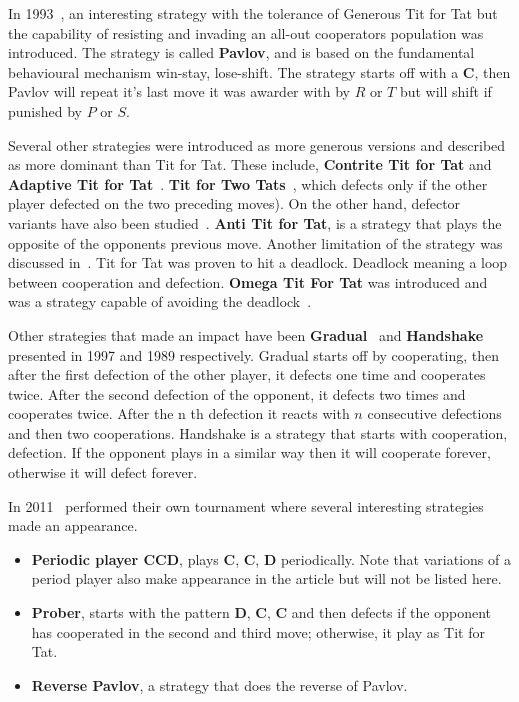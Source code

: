 \documentclass{article}
\begin{document}
In 1993~\cite{Nowak1993}, an interesting strategy with the 
tolerance of Generous Tit for Tat but the capability of resisting and invading
an all-out cooperators population was introduced. The strategy is called \textbf{Pavlov},
and is based on the fundamental behavioural mechanism win-stay, lose-shift.
The strategy starts off with a \textbf{C}, then Pavlov will repeat it's last
move it was awarder with by \(R\) or \(T\) but will shift if punished by \(P\) or
\(S\).

Several other strategies were introduced as more generous versions and 
described as more dominant than Tit for Tat. These include, \textbf{Contrite Tit for Tat}
\cite{Wu1995} and \textbf{Adaptive Tit for Tat}~\cite{tzafestas-2000a}.
\textbf{Tit for Two Tats}~\cite{axelrod1988}, which defects only if the other
player defected on the two preceding moves). On the
other hand, defector variants have also been studied~\cite{Hilde2013}.
\textbf{Anti Tit for Tat}, is a strategy that plays the opposite of the opponents
previous move. Another limitation of the strategy was discussed in~\cite{Wolfgang2006}.
Tit for Tat was proven to hit a deadlock. Deadlock meaning a loop between 
cooperation and defection. \textbf{Omega Tit For Tat} was introduced and was
a strategy capable of avoiding the deadlock~\cite{Wolfgang2006}.

Other strategies that made an impact have been \textbf{Gradual}~\cite{Beaufils1997}
and \textbf{Handshake}~\cite{Robson1989} presented in 1997 and 1989 respectively.
Gradual starts off by cooperating, then after the first defection of the other player, 
it defects one time and cooperates twice. After the second defection of the opponent,
it defects two times and cooperates twice. After the n th defection it reacts with 
\(n\) consecutive defections and then two cooperations. 
Handshake is a strategy that starts with cooperation, defection. If the opponent plays in
a similar way then it will cooperate forever, otherwise it will defect forever.

In 2011~\cite{Li2011} performed their own tournament where several interesting
strategies made an appearance. 

\begin{itemize}
    \item \textbf{Periodic player CCD}, plays \textbf{C}, \textbf{C}, \textbf{D} 
    periodically. Note that variations of a period player also make appearance
    in the article but will not be listed here.
    \item \textbf{Prober}, starts with the pattern \textbf{D}, \textbf{C}, \textbf{C}
     and then defects if the opponent has cooperated in the second and third move;
     otherwise, it play as Tit for Tat.
    \item \textbf{Reverse Pavlov}, a strategy that does the reverse of Pavlov.
\end{itemize}
\end{document}
